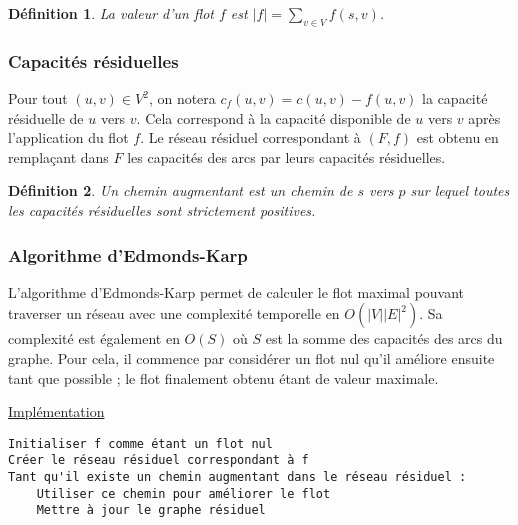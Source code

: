 \documentclass[11pt,a4paper]{article}
\newtheorem*{definition}{Définition}
\begin{document}
\begin{definition}
  La valeur d'un flot \(f\) est \(|f| = \sum\limits_{v \in V} f(s,v)\).
\end{definition}


    \subsubsection{Capacités résiduelles}

Pour tout \((u,v) \in V^2\), on notera \(c_f(u,v) = c(u,v) - f(u,v)\) la capacité résiduelle de \(u\) vers \(v\). Cela correspond à la capacité disponible de \(u\) vers \(v\) après l'application du flot \(f\). Le réseau résiduel correspondant à \((F,f)\) est obtenu en remplaçant dans \(F\) les capacités des arcs par leurs capacités résiduelles.

\begin{definition}
  Un chemin augmentant est un chemin de \(s\) vers \(p\) sur lequel toutes les capacités résiduelles sont strictement positives.
\end{definition}


    \subsubsection{Algorithme d'Edmonds-Karp}
L'algorithme d'Edmonds-Karp permet de calculer le flot maximal pouvant traverser un réseau avec une complexité temporelle en \(O(|V| |E|^2)\). Sa complexité est également en \(O(S)\) où \(S\) est la somme des capacités des arcs du graphe. Pour cela, il commence par considérer un flot nul qu'il améliore ensuite tant que possible ; le flot finalement obtenu étant de valeur maximale.

\noindent\href{https://github.com/AdrienVannson/algo-lib/blob/master/include/graphs/algorithms/edmonds-karp.hpp}{Implémentation}
\begin{lstlisting}
Initialiser f comme étant un flot nul
Créer le réseau résiduel correspondant à f
Tant qu'il existe un chemin augmentant dans le réseau résiduel :
    Utiliser ce chemin pour améliorer le flot
    Mettre à jour le graphe résiduel
\end{lstlisting}
\end{document}
